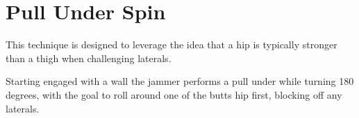 \section{Pull Under Spin}
\label{sec:juke/pull_under_spin}


This technique is designed to leverage the idea that a hip is typically stronger than a thigh when challenging laterals.  


Starting engaged with a wall the jammer performs a pull under while turning 180 degrees, with the goal to roll around one of the butts hip first, blocking off any laterals.     



